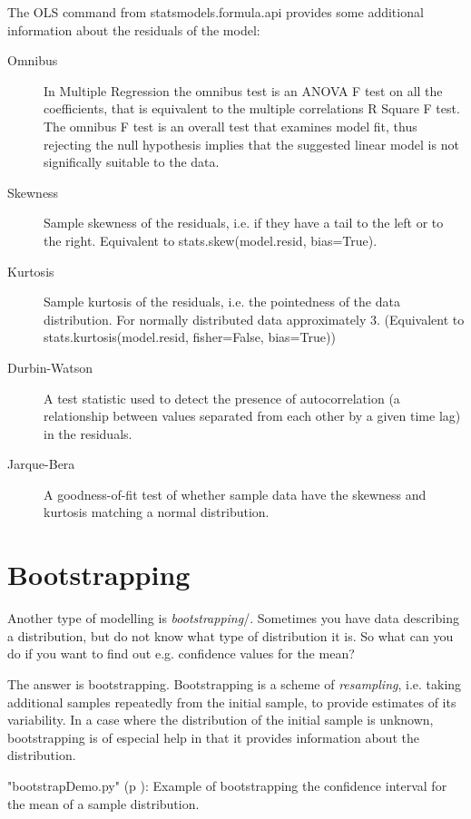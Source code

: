 The \textsf{OLS} command from \textsf{statsmodels.formula.api} provides some additional information about the residuals of the model:
\begin{description}
  \item[Omnibus]     In Multiple Regression the omnibus test is an ANOVA F test on all the coefficients, that is equivalent to the multiple correlations R Square F test. The omnibus F test is an overall test that examines model fit, thus rejecting the null hypothesis implies that the suggested linear model is not significally suitable to the data.
  \item[Skewness] Sample skewness of the residuals, i.e. if they have a tail to the left or to the right. Equivalent to \textsf{stats.skew(model.resid, bias=True)}.
  \item[Kurtosis] Sample kurtosis of the residuals, i.e. the pointedness of the data distribution. For normally distributed data approximately 3. (Equivalent to \textsf{stats.kurtosis(model.resid, fisher=False, bias=True)})
  \item[Durbin-Watson] A test statistic used to detect the presence of autocorrelation (a relationship between values separated from each other by a given time lag) in the residuals.
  \item[Jarque-Bera] A goodness-of-fit test of whether sample data have the skewness and kurtosis matching a normal distribution.
\end{description}

\section{Bootstrapping} 

Another type of modelling is \emph{bootstrapping}/. Sometimes you have data describing a distribution, but do not know what type of distribution it is. So what can you do if you want to find out e.g. confidence values for the mean?

The answer is bootstrapping. Bootstrapping is a scheme of \emph{resampling}, i.e. taking additional samples repeatedly from the initial sample, to provide estimates of its variability. In a case where the distribution of the initial sample is unknown, bootstrapping is of especial help in that it provides information about the distribution.

\PyImg "bootstrapDemo.py" (p \pageref{py:bootstrapDemo}): Example of bootstrapping the confidence interval for the mean of a sample distribution.
